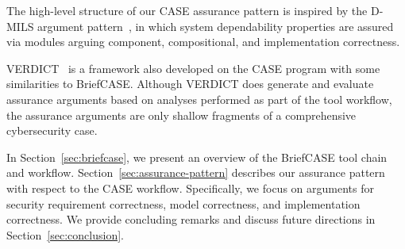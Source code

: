 The high-level structure of our CASE assurance pattern is inspired by the D-MILS argument pattern~\cite{dmils}, in which system dependability properties are assured via modules arguing component, compositional, and implementation correctness.  

VERDICT~\cite{verdict} is a framework also developed on the CASE program with some similarities to BriefCASE.  Although VERDICT does generate and evaluate assurance arguments based on analyses performed as part of the tool workflow, the assurance arguments are only shallow fragments of a comprehensive cybersecurity case.

In Section~\ref{sec:briefcase}, we present an overview of the BriefCASE tool chain and workflow. Section~\ref{sec:assurance-pattern} describes our assurance pattern with respect to the CASE workflow. Specifically, we focus on arguments for security requirement correctness, model correctness, and implementation correctness.  We provide concluding remarks and discuss future directions in Section~\ref{sec:conclusion}.